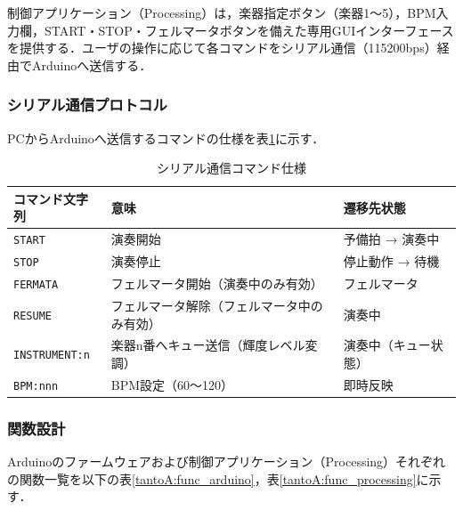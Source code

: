 制御アプリケーション（Processing）は，楽器指定ボタン（楽器1〜5），BPM入力欄，START・STOP・フェルマータボタンを備えた専用GUIインターフェースを提供する．ユーザの操作に応じて各コマンドをシリアル通信（115200bps）経由でArduinoへ送信する．

\subsubsection{シリアル通信プロトコル}
PCからArduinoへ送信するコマンドの仕様を表\ref{tantoA:protocol}に示す．

\begin{table}[H]
\caption{シリアル通信コマンド仕様}
\centering
\begin{tabular}{lll}
    \hline
    コマンド文字列 & 意味 & 遷移先状態 \\\hline
    \texttt{START} & 演奏開始 & 予備拍 → 演奏中 \\
    \texttt{STOP}  & 演奏停止 & 停止動作 → 待機 \\
    \texttt{FERMATA} & フェルマータ開始（演奏中のみ有効） & フェルマータ \\
    \texttt{RESUME} & フェルマータ解除（フェルマータ中のみ有効） & 演奏中 \\
    \texttt{INSTRUMENT:n} & 楽器n番へキュー送信（輝度レベル変調） & 演奏中（キュー状態） \\
    \texttt{BPM:nnn} & BPM設定（60〜120） & 即時反映 \\
    \hline
\end{tabular}
\label{tantoA:protocol}
\end{table}

\subsubsection{関数設計}
Arduinoのファームウェアおよび制御アプリケーション（Processing）それぞれの関数一覧を以下の表\ref{tantoA:func_arduino}，表\ref{tantoA:func_processing}に示す．

